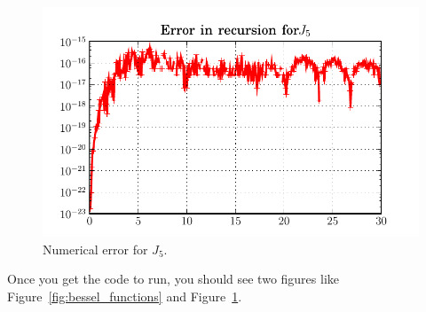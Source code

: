 \begin{figure}
\begin{centering}
\includegraphics[width=5in]{fig/bessel_error}
\par
\end{centering}


\caption{\label{fig:bessel_error}Numerical error for $J_5$.}

\end{figure}

Once you get the code to run, you should see two figures like
Figure~\ref{fig:bessel_functions} and Figure~\ref{fig:bessel_error}.


